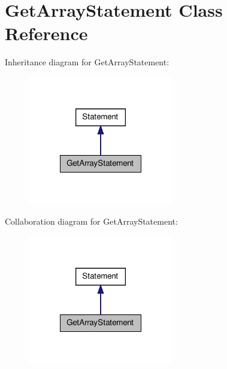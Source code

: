\hypertarget{class_get_array_statement}{\section{Get\-Array\-Statement Class Reference}
\label{class_get_array_statement}
}


Inheritance diagram for Get\-Array\-Statement\-:
\nopagebreak
\begin{figure}[H]
\begin{center}
\leavevmode
\includegraphics[width=180pt]{class_get_array_statement__inherit__graph}
\end{center}
\end{figure}


Collaboration diagram for Get\-Array\-Statement\-:
\nopagebreak
\begin{figure}[H]
\begin{center}
\leavevmode
\includegraphics[width=180pt]{class_get_array_statement__coll__graph}
\end{center}
\end{figure}
